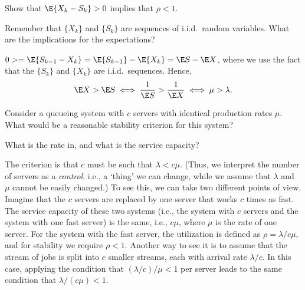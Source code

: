 \begin{exercise}\label{ex:l-253}
 Show 
that $\E{ X_k-S_k} > 0$ implies that $\rho < 1$. 
\begin{hint}
Remember that $\{X_k\}$ and $\{S_k\}$ are sequences of i.i.d.\ random variables. What are the implications for the expectations?
\end{hint}
\begin{solution}
 $0> = \E {S_{k-1}-X_k} = \E{ S_{k-1}}- \E {X_k} = \E S - \E X$, where we use the fact that the $\{S_k\}$ and $\{X_k\}$ are i.i.d.\ sequences. Hence, 
 \begin{equation*}
 \E X > \E S \iff \frac 1{\E S} > \frac1{\E X} \iff \mu > \lambda.
 \end{equation*}

\end{solution}
\end{exercise}


\begin{exercise}\label{ex:l-164}
 Consider a queueing system with $c$ servers with identical production rates $\mu$.
 What would be a reasonable stability criterion for this system?
\begin{hint}
What is the rate in, and what is the service capacity?
\end{hint}
\begin{solution}
 The criterion is that $c$ must be such that $\lambda < c\mu$.
 (Thus, we interpret the number of servers as a \emph{control}, i.e., a `thing' we can change, while we assume that $\lambda$ and $\mu$ cannot be easily changed.)
 To see this, we can take two different points of view.
 Imagine that the $c$ servers are replaced by one server that works $c$ times as fast.
 The service capacity of these two systems (i.e., the system with $c$ servers and the system with one fast server) is the same, i.e., $c\mu$, where $\mu$ is the rate of one server.
 For the system with the fast server, the utilization is defined as $\rho =\lambda/c\mu$, and for stability we require $\rho<1$.
 Another way to see it is to assume that the stream of jobs is split into $c$ smaller streams, each with arrival rate $\lambda/c$.
 In this case, applying the condition that $(\lambda/c )/\mu<1$ per server leads to the same condition that $\lambda/(c\mu) < 1$.
\end{solution}
\end{exercise}







